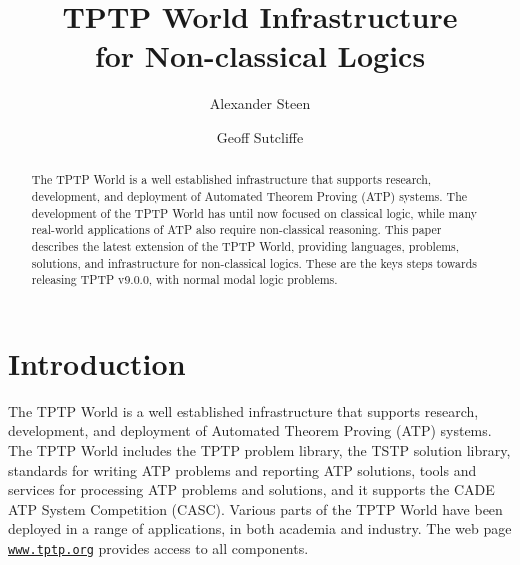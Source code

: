 \documentclass[runningheads]{llncs}
\begin{document}
\title{TPTP World Infrastructure \\ for Non-classical Logics}

\author{Alexander Steen 
\and
Geoff Sutcliffe}

\maketitle
\begin{abstract}
The TPTP World is a well established infrastructure that supports research, 
development, and deployment of Automated Theorem Proving (ATP) systems.
The development of the TPTP World has until now focused on classical logic, while many 
real-world applications of ATP also require non-classical reasoning. 
This paper describes the latest extension of the TPTP World, providing languages, problems,
solutions, and infrastructure for non-classical logics.
These are the keys steps towards releasing TPTP v9.0.0, with normal modal logic problems.

\end{abstract}
\section{Introduction}
\label{Introduction}

The TPTP World \cite{Sut17} is a well established infrastructure that supports research, 
development, and deployment of Automated Theorem Proving (ATP) systems.
The TPTP World includes the TPTP problem library,
the TSTP solution library,
standards for writing ATP problems and reporting ATP solutions,
tools and services for processing ATP problems and solutions,
and it supports the CADE ATP System Competition (CASC).
Various parts of the TPTP World have been deployed in a range of applications,
in both academia and industry.
The web page \href{https://www.tptp.org}{\tt www.tptp.org} provides access to all 
components.
\end{document}
